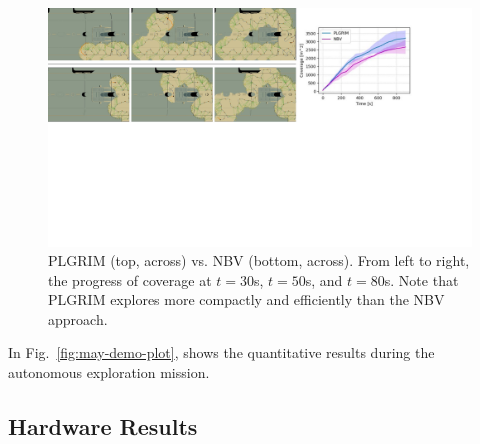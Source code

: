 \documentclass{article}
\begin{document}
\begin{figure}[!t]
  \centering
    \includegraphics[width=1.\textwidth,trim={0 7.5cm 3cm 0},clip]{figures/s2_comparison.pdf}
  \caption{PLGRIM (top, across) vs. NBV (bottom, across). From left to right, the progress of coverage at $t=30$s, $t=50$s, and $t=80$s.  Note that PLGRIM explores more compactly and efficiently than the NBV approach.}
  \label{fig:station-baseline}
\end{figure}


In Fig.~\ref{fig:may-demo-plot}, shows the quantitative results during the autonomous exploration mission.



\subsection{Hardware Results}








\end{document}
